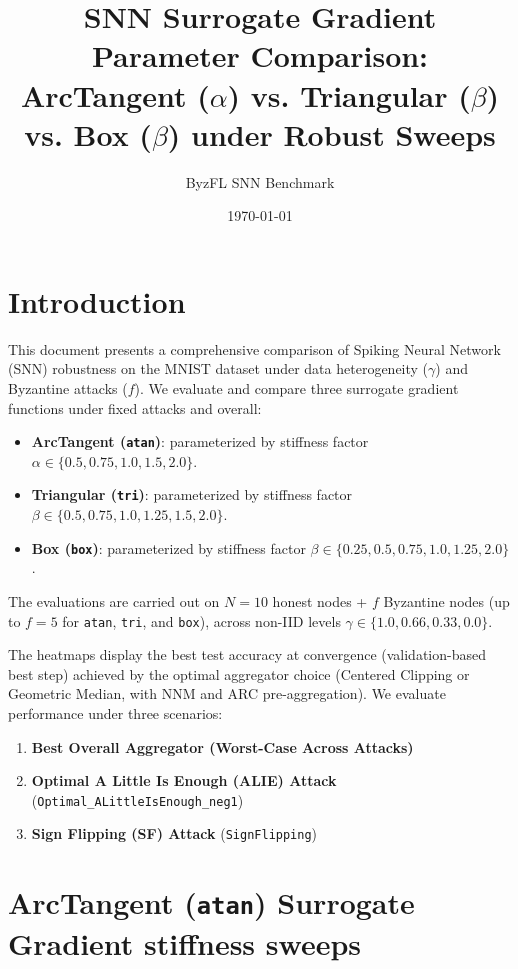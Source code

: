 \documentclass{article}
\title{SNN Surrogate Gradient Parameter Comparison:\\ArcTangent ($\alpha$) vs. Triangular ($\beta$) vs. Box ($\beta$) under Robust Sweeps}
\author{ByzFL SNN Benchmark}
\date{\today}
\begin{document}
\maketitle

\section{Introduction}
This document presents a comprehensive comparison of Spiking Neural Network (SNN) robustness on the MNIST dataset under data heterogeneity ($\gamma$) and Byzantine attacks ($f$). We evaluate and compare three surrogate gradient functions under fixed attacks and overall:
\begin{itemize}
    \item \textbf{ArcTangent (\texttt{atan})}: parameterized by stiffness factor $\alpha \in \{0.5, 0.75, 1.0, 1.5, 2.0\}$.
    \item \textbf{Triangular (\texttt{tri})}: parameterized by stiffness factor $\beta \in \{0.5, 0.75, 1.0, 1.25, 1.5, 2.0\}$.
    \item \textbf{Box (\texttt{box})}: parameterized by stiffness factor $\beta \in \{0.25, 0.5, 0.75, 1.0, 1.25, 2.0\}$.
\end{itemize}

The evaluations are carried out on $N = 10$ honest nodes + $f$ Byzantine nodes (up to $f=5$ for \texttt{atan}, \texttt{tri}, and \texttt{box}), across non-IID levels $\gamma \in \{1.0, 0.66, 0.33, 0.0\}$. 

The heatmaps display the best test accuracy at convergence (validation-based best step) achieved by the optimal aggregator choice (Centered Clipping or Geometric Median, with NNM and ARC pre-aggregation). We evaluate performance under three scenarios:
\begin{enumerate}
    \item \textbf{Best Overall Aggregator (Worst-Case Across Attacks)}
    \item \textbf{Optimal A Little Is Enough (ALIE) Attack} (\texttt{Optimal\_ALittleIsEnough\_neg1})
    \item \textbf{Sign Flipping (SF) Attack} (\texttt{SignFlipping})
\end{enumerate}

\clearpage

\section{ArcTangent (\texttt{atan}) Surrogate Gradient stiffness sweeps}
\end{document}
